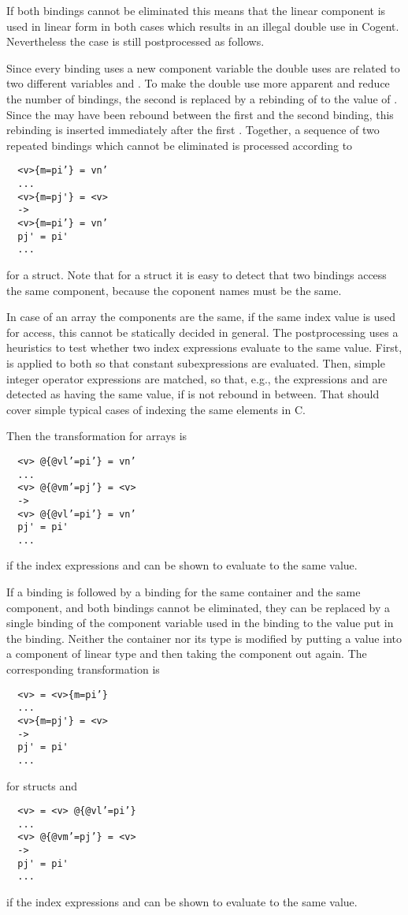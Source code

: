 If both  bindings cannot be eliminated this means that the linear component is used in linear form in both cases
which results in an illegal double use in Cogent. Nevertheless the case is still postprocessed as follows.

Since every  binding uses a new component variable  the double uses are related to two different variables 
 and . To make the double use more apparent and reduce the
number of  bindings, the second  is replaced by a rebinding of  to the value of . Since 
the  may have been rebound between the first and the second  binding, this rebinding is inserted immediately
after the first . Together, a sequence of two repeated  bindings which cannot be eliminated is processed 
according to
\begin{verbatim}
  <v>{m=pi’} = vn’
  ...
  <v>{m=pj'} = <v>
  ->
  <v>{m=pi’} = vn’
  pj' = pi'
  ...
\end{verbatim}
for a struct. Note that for a struct it is easy to detect that two  bindings access the same component, because the coponent
names must be the same. 

In case of an array the components are the same, if the same index value is used for access, this cannot be 
statically decided in general. The postprocessing uses a heuristics to test whether two index expressions evaluate to the same
value. First,  is applied to both so that constant subexpressions are evaluated. Then, simple integer operator
expressions are matched, so that, e.g., the expressions  and  are detected as having the same value, 
if  is not rebound in between. That should cover simple typical cases of indexing the same elements in C.

Then the transformation for arrays is
\begin{verbatim}
  <v> @{@vl’=pi’} = vn’
  ...
  <v> @{@vm’=pj’} = <v>
  ->
  <v> @{@vl’=pi’} = vn’
  pj' = pi'
  ...
\end{verbatim}
if the index expressions  and  can be shown to evaluate to the same value.

If a  binding is followed by a  binding for the same container and the same component, and both bindings cannot
be eliminated, they can be replaced by a single binding of the component variable used in the  binding to the value 
put in the  binding. Neither the container nor its type is modified by putting a value into a component of linear type and then
taking the component out again. The corresponding transformation is
\begin{verbatim}
  <v> = <v>{m=pi’}
  ...
  <v>{m=pj'} = <v>
  ->
  pj' = pi'
  ...
\end{verbatim}
for structs and
\begin{verbatim}
  <v> = <v> @{@vl’=pi’}
  ...
  <v> @{@vm’=pj’} = <v>
  ->
  pj' = pi'
  ...
\end{verbatim}
if the index expressions  and  can be shown to evaluate to the same value.

